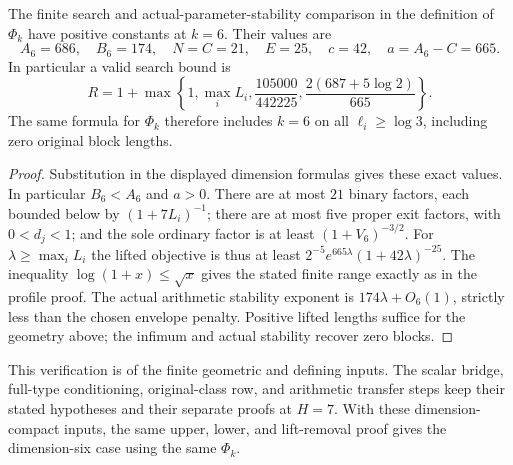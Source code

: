 \begin{proposition}
\label{k6geom:lift}
The finite search and actual-parameter-stability comparison in the
definition of $\Phi_k$ have positive constants at $k=6$. Their values are
\[
 A_6=686,\quad B_6=174,\quad N=C=21,\quad E=25,
 \quad c=42,\quad a=A_6-C=665.
\]
In particular a valid search bound is
\[
 R=1+\max\left\{1,\max_iL_i,
       \frac{105000}{442225},
       \frac{2(687+5\log2)}{665}\right\}.
\]
The same formula for $\Phi_k$ therefore includes $k=6$ on all
$\ell_i\geq\log3$, including zero original block lengths.
\end{proposition}
\begin{proof}
Substitution in the displayed dimension formulas gives these exact
values. In particular $B_6<A_6$ and $a>0$. There are at most $21$
binary factors, each bounded below by $(1+7L_i)^{-1}$;
there are at most five proper exit factors, with $0<d_j<1$; and
the sole ordinary factor is at least $(1+V_6)^{-3/2}$.
For $\lambda\geq\max_iL_i$ the lifted objective is thus at least
$2^{-5}e^{665\lambda}(1+42\lambda)^{-25}$.
The inequality $\log(1+x)\leq\sqrt x$ gives the stated finite
range exactly as in the profile proof. The actual arithmetic
stability exponent is $174\lambda+O_6(1)$, strictly less than the
chosen envelope penalty. Positive lifted lengths suffice for the
geometry above; the infimum and actual stability recover zero blocks.
\end{proof}

\begin{remark}
This verification is of the finite geometric and defining inputs.
The scalar bridge, full-type conditioning, original-class row, and
arithmetic transfer steps keep their stated hypotheses and their
separate proofs at $H=7$. With these dimension-compact inputs, the
same upper, lower, and lift-removal proof gives the dimension-six
case using the same $\Phi_k$.
\end{remark}
